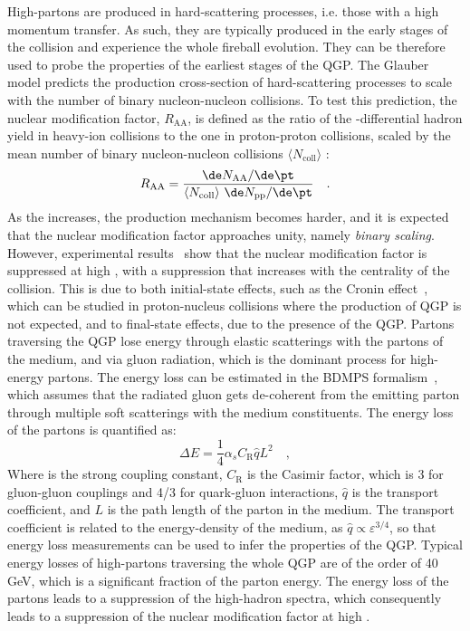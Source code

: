 High-\pt partons are produced in hard-scattering processes, i.e. those with a high momentum transfer. As such, they are typically produced in the early stages of the collision and experience the whole fireball evolution. They can be therefore used to probe the properties of the earliest stages of the QGP. The Glauber model predicts the production cross-section of hard-scattering processes to scale with the number of binary nucleon-nucleon collisions. To test this prediction, the nuclear modification factor, $R_\mathrm{AA}$, is defined as the ratio of the \pt-differential hadron yield in heavy-ion collisions to the one in proton-proton collisions, scaled by the mean number of binary nucleon-nucleon collisions $\langle N_\mathrm{coll} \rangle$ :
\begin{equation*}
    R_\mathrm{AA} = \frac{\de N_\mathrm{AA}/\de\pt}{\langle N_\mathrm{coll} \rangle~\de N_\mathrm{pp}/\de\pt}\quad .
\end{equation*}
As the \pt increases, the production mechanism becomes harder, and it is expected that the nuclear modification factor approaches unity, namely \emph{binary scaling}. However, experimental results~\cite{ALICE:2018vuu} show that the nuclear modification factor is suppressed at high \pt, with a suppression that increases with the centrality of the collision. This is due to both initial-state effects, such as the Cronin effect~\cite{Kopeliovich:2002yh}, which can be studied in proton-nucleus collisions where the production of QGP is not expected, and to final-state effects, due to the presence of the QGP. Partons traversing the QGP lose energy through elastic scatterings with the partons of the medium, and via gluon radiation, which is the dominant process for high-energy partons. The energy loss can be estimated in the BDMPS formalism~\cite{Baier:1996kr}, which assumes that the radiated gluon gets de-coherent from the emitting parton through multiple soft scatterings with the medium constituents. The energy loss of the partons is quantified as:
\begin{equation*}
    \Delta E = \frac{1}{4}\alpha_s C_\mathrm{R}\hat{q}L^2\quad ,
\end{equation*}
Where \als is the strong coupling constant, $C_\mathrm{R}$ is the Casimir factor, which is 3 for gluon-gluon couplings and 4/3 for quark-gluon interactions, $\hat{q}$ is the transport coefficient, and $L$ is the path length of the parton in the medium. The transport coefficient is related to the energy-density of the medium, as $\hat{q} \propto \varepsilon^{3/4}$, so that energy loss measurements can be used to infer the properties of the QGP. Typical energy losses of high-\pt partons traversing the whole QGP are of the order of 40 GeV, which is a significant fraction of the parton energy. The energy loss of the partons leads to a suppression of the high-\pt hadron spectra, which consequently leads to a suppression of the nuclear modification factor at high \pt. 

